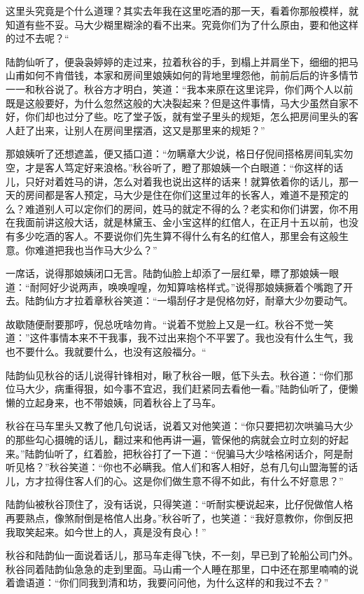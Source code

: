 \documentclass[12pt,UTF8]{ctexbook}
\begin{document}
{{{这里头究竟是个什么道理？其实去年我在这里吃酒的那一天，看着你那般模样，就知道有些不妥。马大少糊里糊涂的看不出来。究竟你们为了什么原由，要和他这样的过不去呢？“

陆韵仙听了，便袅袅婷婷的走过来，拉着秋谷的手，到榻上并肩坐下，细细的把马山甫如何不肯借钱，本家和房间里娘姨如何的背地里埋怨他，前前后后的许多情节一一和秋谷说了。秋谷方才明白，笑道：“我本来原在这里诧异，你们两个人以前既是这般要好，为什么忽然这般的大决裂起来？但是这件事情，马大少虽然自家不好，你们却也过分了些。吃了堂子饭，就有堂子里头的规矩，怎么把房间里头的客人赶了出来，让别人在房间里摆酒，这又是那里来的规矩？”

那娘姨听了还想遮盖，便又插口道：“勿瞒章大少说，格日仔倪间搭格房间轧实勿空，才是客人笃定好来浪格。”秋谷听了，瞪了那娘姨一个白眼道：“你这样的话儿，只好对着姓马的讲，怎么对着我也说出这样的话来！就算依着你的话儿，那一天的房间都是客人预定，马大少是住在你们这里过年的长客人，难道不是预定的么？难道别人可以定你们的房间，姓马的就定不得的么？老实和你们讲罢，你不用在我面前讲这般大话，就是林黛玉、金小宝这样的红倌人，在正月十五以前，也没有多少吃酒的客人。不要说你们先生算不得什么有名的红倌人，那里会有这般生意。你难道把我也当作马大少么？”

一席话，说得那娘姨闭口无言。陆韵仙脸上却添了一层红晕，瞟了那娘姨一眼道：“耐阿好少说两声，唤唤喤喤，勿知算啥格样式。”说得那娘姨撅着个嘴跑了开去。陆韵仙方才拉着章秋谷笑道：“一塌刮仔才是倪格勿好，耐章大少勿要动气。

故歇随便耐要那哼，倪总呒啥勿肯。“说着不觉脸上又是一红。秋谷不觉一笑道：”这件事情本来不干我事，我不过出来抱个不平罢了。我也没有什么生气，我也不要什么。我就要什么，也没有这般福分。“

陆韵仙见秋谷的话儿说得针锋相对，瞅了秋谷一眼，低下头去。秋谷道：“你们那位马大少，病重得狠，如今事不宜迟，我们赶紧同去看他一看。”陆韵仙听了，便懒懒的立起身来，也不带娘姨，同着秋谷上了马车。

秋谷在马车里头又教了他几句说话，说着又对他笑道：“你只要把初次哄骗马大少的那些勾心摄魄的话儿，翻过来和他再讲一遍，管保他的病就会立时立刻的好起来。”陆韵仙听了，红着脸，把秋谷打了一下道：“倪骗马大少啥格闲话介，阿是耐听见格？”秋谷笑道：“你也不必瞒我。倌人们和客人相好，总有几句山盟海誓的话儿，方才拉得住客人们的心。这是你们做生意不得不如此，有什么不好意思？”

陆韵仙被秋谷顶住了，没有话说，只得笑道：“听耐实梗说起来，比仔倪做倌人格再要熟点，像煞耐倒是格倌人出身。”秋谷听了，也笑道：“我好意教你，你倒反把我取笑起来。如今世上的人，真是没有良心！”

秋谷和陆韵仙一面说着话儿，那马车走得飞快，不一刻，早已到了轮船公司门外。秋谷同着陆韵仙急急的走到里面。马山甫一个人睡在那里，口中还在那里喃喃的说着谵语道：“你们同我到清和坊，我要问问他，为什么这样的和我过不去？”

}}}
\end{document}
